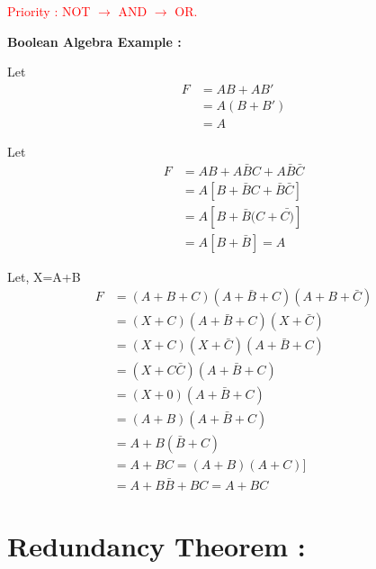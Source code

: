 \documentclass[a4aper,12pt]{report}
\newcounter{examplebox}[chapter]
\begin{document}
\textcolor{red}{Priority : NOT $\rightarrow$ AND $\rightarrow$ OR.}
\vspace{1em}
\par {\large \textbf{Boolean Algebra Example : }}
\begin{examplebox}[Solve AB+A$B'$]
 Let 
\begin{align*}
      F&=AB+AB'\\
      &=A(B+B')\\
      &=A
\end{align*}
  
\end{examplebox}
\vspace{5pt}
\begin{examplebox}
    Let 
    \begin{align*}
        F &= AB+A\bar{B}C+A\bar{B}\bar{C}\\
        &= A[B+\bar{B}C+\bar{B}\bar{C}]\\
        &= A[B+\bar{B}(C+\bar{C)}]\\
        &=A[B+\bar{B}]=A
    \end{align*}
    
\end{examplebox}
\vspace{5pt}
\begin{examplebox}
Let,
X=A+B
\begin{align*}
    F &=(A+B+C)(A+\bar{B}+C)(A+B+\bar{C}) \\ 
    &=(X+C)(A+\bar{B}+C)(X+\bar{C}) \\
    &=(X+C)(X+\bar{C})(A+\bar{B}+C) \\
    &=(X+C\bar{C})(A+\bar{B}+C)\\
    &=(X+0)(A+\bar{B}+C)\\
    &=(A+B)(A+\bar{B}+C)\\
    &=A+B(\bar{B}+C)\\
    &=A+BC=(A+B)(A+C)]\\
    &=A+B\bar{B}+BC=A+BC
\end{align*}
 
\end{examplebox}
\vspace{1em}

\section{Redundancy Theorem : }
\end{document}
